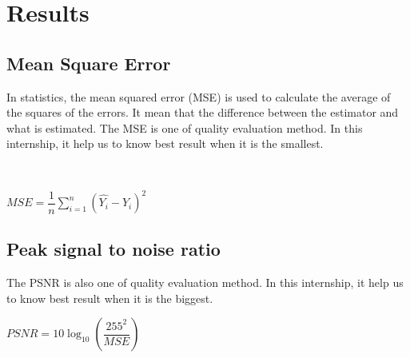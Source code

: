 \chapter{Results}
\section*{Mean Square Error}
In statistics, the mean squared error (MSE) is used to calculate the average of the squares of the errors. It
mean that the difference between the estimator and what is estimated.
The MSE is one of quality evaluation method. In this internship, it help us to know best result when it is the smallest.
 





\

\begin{center}

	$MSE =  \dfrac{1}{n} \displaystyle \sum_{i=1}^{n}(\hat{Y_i} - Y_i)^2$
	

\end{center}
\vspace{3cm}

\section*{Peak signal to noise ratio}
The PSNR is also one of quality evaluation method. In this internship, it help us to know best result when it is the biggest. 

\vspace{1cm}

\begin{center}
	
	$PSNR = 10\log_{10}\left(\dfrac{255^2}{MSE}\right)  $
	
	
\end{center}
\newpage
